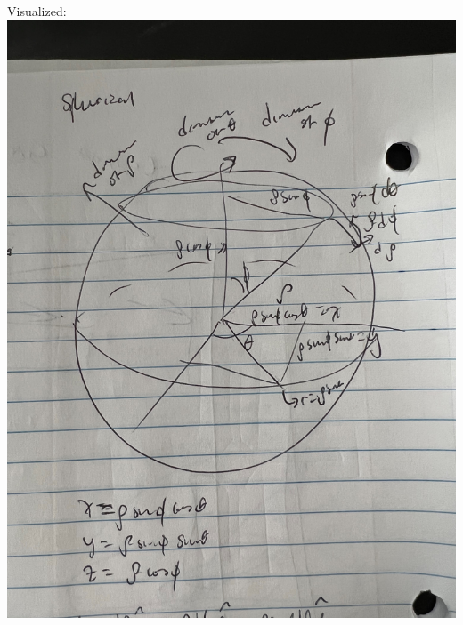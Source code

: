 \documentclass{article}
\begin{document}
\begin{outline}
        \1 Visualized: \\\includegraphics[scale=0.11]{spherical.jpg}

    \end{outline}
\end{document}
